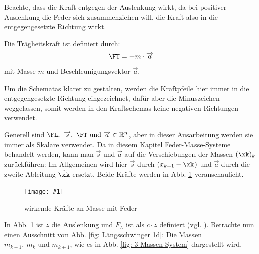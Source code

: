 \documentclass[a4paper,12pt]{report}
\newcommand{\bild}[4]{
      \begin{figure}[!htp]
            \centering
            \texttt{[image: \#1]}
            \caption{#3}
            #4
      \end{figure}
}
\newcommand{\R}{\mathbb R}
\theoremstyle{plain} %
\theoremstyle{definition} %
\theoremstyle{remark}
\begin{document}
            Beachte, dass die Kraft entgegen der Auslenkung wirkt, da bei positiver Auslenkung die Feder sich zusammenziehen will, die Kraft also in die entgegengesetzte Richtung wirkt.
                  
            Die Trägheitskraft \FT ist definiert durch:
            \begin{equation}
                  \label{eqn: Trägheitskraft}
                  \FT = -m\cdot \overrightarrow{a}
            \end{equation}
            mit Masse $m$ und Beschleunigungsvektor $\overrightarrow{a}$.                  

            Um die Schematas klarer zu gestalten, werden die Kraftpfeile hier immer in die entgegengesetzte Richtung eingezeichnet, dafür aber die Minuszeichen weggelassen,
            somit werden in den Kraftschemas keine negativen Richtungen verwendet.

            Generell sind $\FL,\ \overrightarrow{s},\ \FT \text{ und } \overrightarrow{a}\in \R^n$, aber in dieser Ausarbeitung werden sie immer als Skalare verwendet. 
            Da in diesem Kapitel Feder-Masse-Systeme behandelt werden, kann man $\overrightarrow{s}$ und $\overrightarrow{a}$ auf die Verschiebungen der Massen $(\xk)_k$ zurückführen:
            Im Allgemeinen wird hier $\overrightarrow{s}$ durch $(x_{k+1}-\xk)$ und $\overrightarrow{a}$ durch die zweite Ableitung $\ddot \xk$ ersetzt.
            Beide Kräfte werden in Abb. \ref{fig: KräfteAnFeder} veranschaulicht.

            \bild{Federkraft und Trägheitskraft.png}{0.4}{wirkende Kräfte an Masse mit Feder \cite{federkraft}}{\label{fig: KräfteAnFeder}}
            
            In Abb. \ref{fig: KräfteAnFeder} ist $z$ die Auslenkung und $F_L$ ist als $c\cdot z$ definiert (vgl. \cite{federkraft}).
            Betrachte nun einen Ausschnitt von Abb. \ref{fig: Längsschwinger 1d}: Die Massen $m_{k-1},\ m_k\text{ und }m_{k+1}$, wie es in Abb. \ref{fig: 3 Massen System} dargestellt wird.
\end{document}
